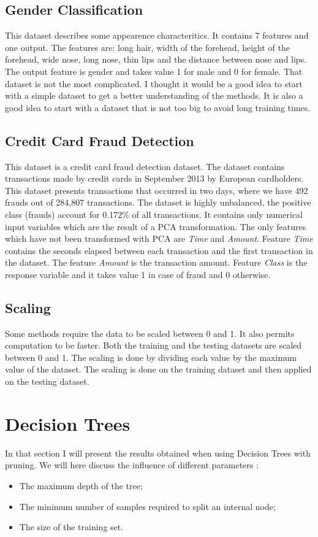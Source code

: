 \documentclass[10pt]{article}
\begin{document}
		\subsection*{Gender Classification}
			This dataset describes some appearence characteritics. It contains 7 features and one output. The features are: long hair, width of the forehead, height of the forehead, wide nose, long nose, thin lips and the distance between nose and lips. The output feature is gender and takes value 1 for male and 0 for female. That dataset is not the most complicated. I thought it would be a good idea to start with a simple dataset to get a better understanding of the methods. It is also a good idea to start with a dataset that is not too big to avoid long training times.
		\subsection*{Credit Card Fraud Detection}
			This dataset is a credit card fraud detection dataset. The dataset contains transactions made by credit cards in September 2013 by European cardholders. This dataset presents transactions that occurred in two days, where we have 492 frauds out of 284,807 transactions. The dataset is highly unbalanced, the positive class (frauds) account for 0.172\% of all transactions. It contains only numerical input variables which are the result of a PCA transformation. The only features which have not been transformed with PCA are \textit{Time} and \textit{Amount}. Feature \textit{Time} contains the seconds elapsed between each transaction and the first transaction in the dataset. The feature \textit{Amount} is the transaction amount. Feature \textit{Class} is the response variable and it takes value 1 in case of fraud and 0 otherwise.
		\subsection*{Scaling}
			Some methods require the data to be scaled between 0 and 1. It also permits computation to be faster. Both the training and the testing datasets are scaled between 0 and 1. The scaling is done by dividing each value by the maximum value of the dataset. The scaling is done on the training dataset and then applied on the testing dataset.
	\section{Decision Trees}
		In that section I will present the results obtained when using Decision Trees with pruning. We will here discuss the influence of different parameters :
		\begin{itemize}
			\item The maximum depth of the tree;
			\item The minimum number of samples required to split an internal node;
			\item The size of the training set.
		\end{itemize}
\end{document}
